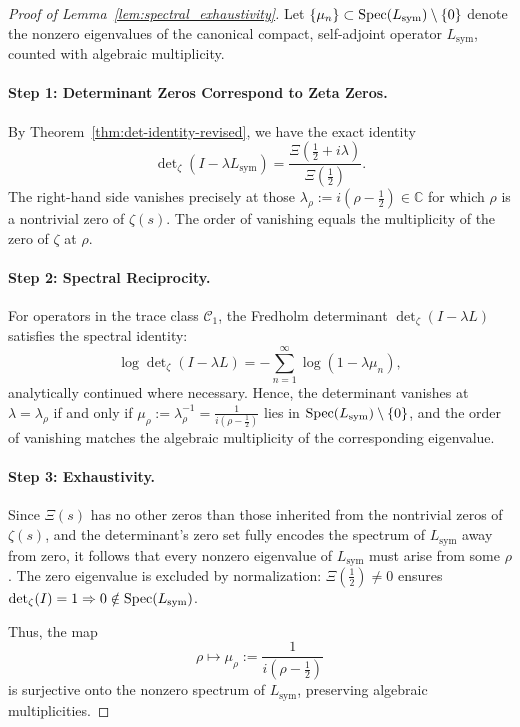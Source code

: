 \begin{proof}[Proof of Lemma~\ref{lem:spectral_exhaustivity}]
Let \( \{ \mu_n \} \subset \operatorname{Spec}(L_{\mathrm{sym}}) \setminus \{0\} \) denote the nonzero eigenvalues of the canonical compact, self-adjoint operator \( L_{\mathrm{sym}} \), counted with algebraic multiplicity.

\paragraph{Step 1: Determinant Zeros Correspond to Zeta Zeros.}
By Theorem~\ref{thm:det-identity-revised}, we have the exact identity
\[
\det\nolimits_\zeta(I - \lambda L_{\mathrm{sym}}) = \frac{\Xi(\tfrac{1}{2} + i\lambda)}{\Xi(\tfrac{1}{2})}.
\]
The right-hand side vanishes precisely at those \( \lambda_\rho := i(\rho - \tfrac{1}{2}) \in \mathbb{C} \) for which \( \rho \) is a nontrivial zero of \( \zeta(s) \). The order of vanishing equals the multiplicity of the zero of \( \zeta \) at \( \rho \).

\paragraph{Step 2: Spectral Reciprocity.}
For operators in the trace class \( \mathcal{C}_1 \), the Fredholm determinant \(\det_\zeta(I - \lambda L)\) satisfies the spectral identity:
\[
\log \det\nolimits_\zeta(I - \lambda L) = -\sum_{n=1}^\infty \log(1 - \lambda \mu_n),
\]
analytically continued where necessary. Hence, the determinant vanishes at \( \lambda = \lambda_\rho \) if and only if \( \mu_\rho := \lambda_\rho^{-1} = \frac{1}{i(\rho - \tfrac{1}{2})} \) lies in \( \operatorname{Spec}(L_{\mathrm{sym}}) \setminus \{0\} \), and the order of vanishing matches the algebraic multiplicity of the corresponding eigenvalue.

\paragraph{Step 3: Exhaustivity.}
Since \( \Xi(s) \) has no other zeros than those inherited from the nontrivial zeros of \( \zeta(s) \), and the determinant’s zero set fully encodes the spectrum of \( L_{\mathrm{sym}} \) away from zero, it follows that every nonzero eigenvalue of \( L_{\mathrm{sym}} \) must arise from some \( \rho \). The zero eigenvalue is excluded by normalization: \(\Xi(\tfrac{1}{2}) \neq 0\) ensures \(\det_\zeta(I) = 1 \Rightarrow 0 \notin \operatorname{Spec}(L_{\mathrm{sym}})\).

\medskip
\noindent
Thus, the map
\[
\rho \mapsto \mu_\rho := \frac{1}{i(\rho - \tfrac{1}{2})}
\]
is surjective onto the nonzero spectrum of \( L_{\mathrm{sym}} \), preserving algebraic multiplicities.
\end{proof}
%  